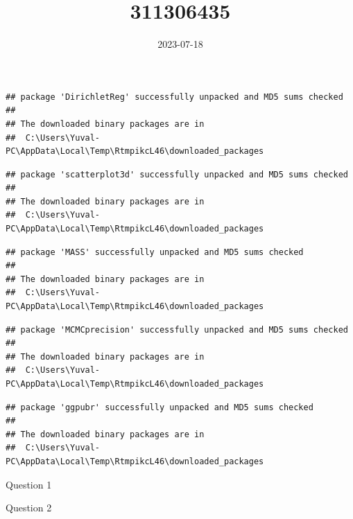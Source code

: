 \documentclass[
]{article}
\title{311306435}
\author{}
\date{\vspace{-2.5em}2023-07-18}
\begin{document}
\maketitle

\begin{verbatim}
## package 'DirichletReg' successfully unpacked and MD5 sums checked
## 
## The downloaded binary packages are in
##  C:\Users\Yuval-PC\AppData\Local\Temp\RtmpikcL46\downloaded_packages
\end{verbatim}

\begin{verbatim}
## package 'scatterplot3d' successfully unpacked and MD5 sums checked
## 
## The downloaded binary packages are in
##  C:\Users\Yuval-PC\AppData\Local\Temp\RtmpikcL46\downloaded_packages
\end{verbatim}

\begin{verbatim}
## package 'MASS' successfully unpacked and MD5 sums checked
## 
## The downloaded binary packages are in
##  C:\Users\Yuval-PC\AppData\Local\Temp\RtmpikcL46\downloaded_packages
\end{verbatim}

\begin{verbatim}
## package 'MCMCprecision' successfully unpacked and MD5 sums checked
## 
## The downloaded binary packages are in
##  C:\Users\Yuval-PC\AppData\Local\Temp\RtmpikcL46\downloaded_packages
\end{verbatim}

\begin{verbatim}
## package 'ggpubr' successfully unpacked and MD5 sums checked
## 
## The downloaded binary packages are in
##  C:\Users\Yuval-PC\AppData\Local\Temp\RtmpikcL46\downloaded_packages
\end{verbatim}

Question 1

Question 2
\end{document}
